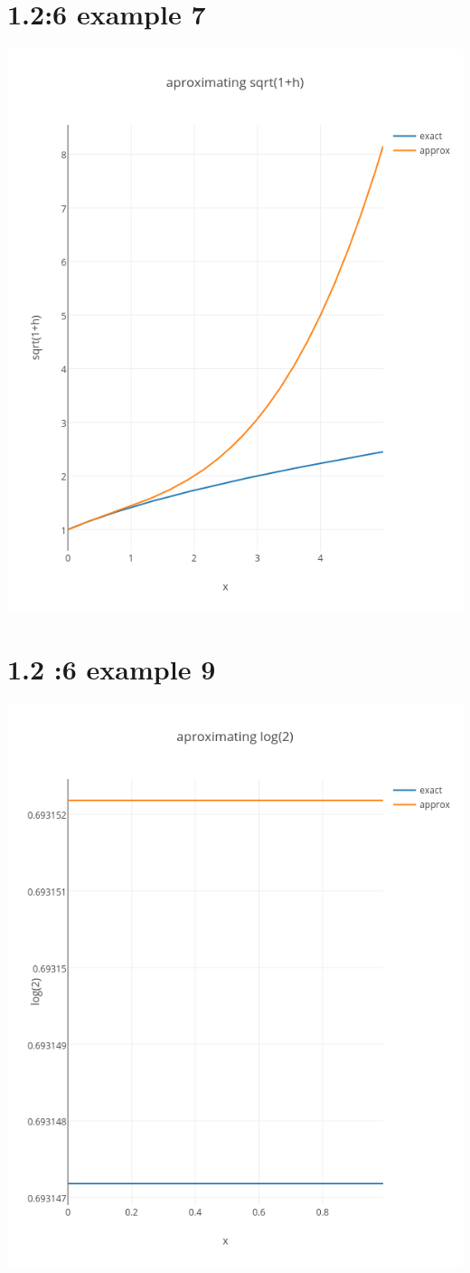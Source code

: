 \documentclass{article}
\begin{document}
\section*{1.2:6 example 7}
\includegraphics[scale = .5]{images/sqrt.png}
\label{sec:1.2:6 example 7}

\section*{1.2 :6 example 9}
\includegraphics[scale=.5]{images/log.png}
\end{document}
